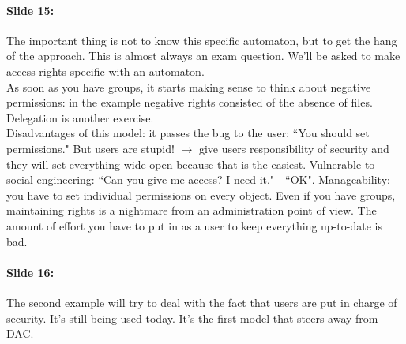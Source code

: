 \documentclass[10pt,a4paper]{report}
\begin{document}
\paragraph{Slide 15:} The important thing is not to know this specific automaton, but to get the hang of the approach. This is almost always an exam question. We'll be asked to make access rights specific with an automaton.\\
As soon as you have groups, it starts making sense to think about negative permissions: in the example negative rights consisted of the absence of files.\\
Delegation is another exercise.\\
Disadvantages of this model: it passes the bug to the user: ``You should set permissions." But users are stupid! $\rightarrow$ give users responsibility of security and they will set everything wide open because that is the easiest. Vulnerable to social engineering: ``Can you give me access? I need it." - ``OK". Manageability: you have to set individual permissions on every object. Even if you have groups, maintaining rights is a nightmare from an administration point of view. The amount of effort you have to put in as a user to keep everything up-to-date is bad.

\paragraph{Slide 16:} The second example will try to deal with the fact that users are put in charge of security. It's still being used today. It's the first model that steers away from DAC.
\end{document}
